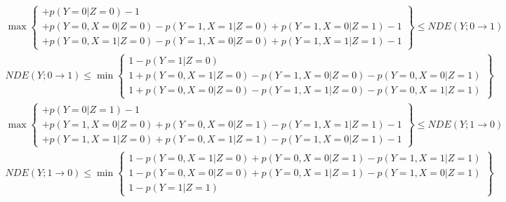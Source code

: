 {\tiny\begin{align*}
  \max \left\{\begin{array}{l}
  +p(Y=0|Z=0) -1 \\
  +p(Y=0,X=0|Z=0) -p(Y=1,X=1|Z=0) +p(Y=1,X=0|Z=1) -1 \\
  +p(Y=0,X=1|Z=0) -p(Y=1,X=0|Z=0) +p(Y=1,X=1|Z=1) -1
  \end{array} \right\} \le NDE(Y;0 \to 1) \\
  NDE(Y;0\to 1) \le \min \left\{\begin{array}{l}
    1 -p(Y=1|Z=0) \\
    1 +p(Y=0,X=1|Z=0) -p(Y=1,X=0|Z=0) -p(Y=0,X=0|Z=1) \\
    1 +p(Y=0,X=0|Z=0) -p(Y=1,X=1|Z=0) -p(Y=0,X=1|Z=1) 
  \end{array}\right\} \\
  \max \left\{\begin{array}{l}
  +p(Y=0|Z=1) -1 \\
  +p(Y=1,X=0|Z=0) +p(Y=0,X=0|Z=1) -p(Y=1,X=1|Z=1) -1 \\
  +p(Y=1,X=1|Z=0) +p(Y=0,X=1|Z=1) -p(Y=1,X=0|Z=1) -1 
  \end{array}\right\} \le NDE(Y;1 \to 0) \\
  NDE(Y;1 \to 0) \le \min \left\{\begin{array}{l}
    1 -p(Y=0,X=1|Z=0) +p(Y=0,X=0|Z=1) -p(Y=1,X=1|Z=1) \\
    1 -p(Y=0,X=0|Z=0) +p(Y=0,X=1|Z=1) -p(Y=1,X=0|Z=1) \\
    1 -p(Y=1|Z=1)
  \end{array}\right\}
\end{align*}}

